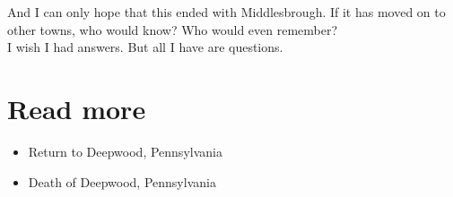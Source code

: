 \documentclass[a5paper]{scrartcl}
\begin{document}
And I can only hope that this ended with Middlesbrough. If it has moved on to other towns, who would know? Who would even remember? \\


I wish I had answers. But all I have are questions.

\section{Read more}

\begin{itemize}
    \item Return to Deepwood, Pennsylvania
    \item Death of Deepwood, Pennsylvania
\end{itemize}
\end{document}
